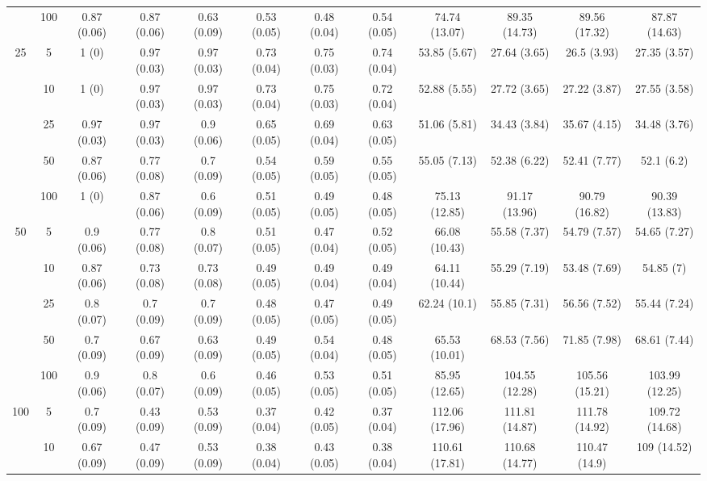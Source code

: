 \documentclass[10pt]{article}
\theoremstyle{definition}
\begin{document}
\begin{table}[H]
\begin{center}
{\begin{tabular}{cc|ccc|ccc|cccc|}
    & 100  & 0.87 (0.06) & 0.87 (0.06) & 0.63 (0.09) & 0.53 (0.05) & 0.48 (0.04) & 0.54 (0.05) & 74.74 (13.07) & 89.35 (14.73) & 89.56 (17.32) & 87.87 (14.63)\\[.3cm] 
   \multirow{5}{*}{25}  & 5  & 1 (0) & 0.97 (0.03) & 0.97 (0.03) & 0.73 (0.04) & 0.75 (0.03) & 0.74 (0.04) & 53.85 (5.67) & 27.64 (3.65) & 26.5 (3.93) & 27.35 (3.57) \\ 
    & 10  & 1 (0) & 0.97 (0.03) & 0.97 (0.03) & 0.73 (0.04) & 0.75 (0.03) & 0.72 (0.04) & 52.88 (5.55) & 27.72 (3.65) & 27.22 (3.87) & 27.55 (3.58) \\ 
    & 25  & 0.97 (0.03) & 0.97 (0.03) & 0.9 (0.06) & 0.65 (0.05) & 0.69 (0.04) & 0.63 (0.05) & 51.06 (5.81) & 34.43 (3.84) & 35.67 (4.15) & 34.48 (3.76) \\ 
    & 50  & 0.87 (0.06) & 0.77 (0.08) & 0.7 (0.09) & 0.54 (0.05) & 0.59 (0.05) & 0.55 (0.05) & 55.05 (7.13) & 52.38 (6.22) & 52.41 (7.77) & 52.1 (6.2) \\ 
    & 100  & 1 (0) & 0.87 (0.06) & 0.6 (0.09) & 0.51 (0.05) & 0.49 (0.05) & 0.48 (0.05) & 75.13 (12.85) & 91.17 (13.96) & 90.79 (16.82) & 90.39 (13.83) \\[.3cm]
   \multirow{5}{*}{50}  & 5  & 0.9 (0.06) & 0.77 (0.08) & 0.8 (0.07) & 0.51 (0.05) & 0.47 (0.04) & 0.52 (0.05) & 66.08 (10.43) & 55.58 (7.37) & 54.79 (7.57) & 54.65 (7.27) \\ 
    & 10  & 0.87 (0.06) & 0.73 (0.08) & 0.73 (0.08) & 0.49 (0.05) & 0.49 (0.04) & 0.49 (0.04) & 64.11 (10.44) & 55.29 (7.19) & 53.48 (7.69) & 54.85 (7) \\ 
    & 25  & 0.8 (0.07) & 0.7 (0.09) & 0.7 (0.09) & 0.48 (0.05) & 0.47 (0.05) & 0.49 (0.05) & 62.24 (10.1) & 55.85 (7.31) & 56.56 (7.52) & 55.44 (7.24) \\ 
    & 50  & 0.7 (0.09) & 0.67 (0.09) & 0.63 (0.09) & 0.49 (0.05) & 0.54 (0.04) & 0.48 (0.05) & 65.53 (10.01) & 68.53 (7.56) & 71.85 (7.98) & 68.61 (7.44) \\ 
    & 100  & 0.9 (0.06) & 0.8 (0.07) & 0.6 (0.09) & 0.46 (0.05) & 0.53 (0.05) & 0.51 (0.05) & 85.95 (12.65) & 104.55 (12.28) & 105.56 (15.21) & 103.99 (12.25) \\[.3cm] 
   \multirow{5}{*}{100}  & 5  & 0.7 (0.09) & 0.43 (0.09) & 0.53 (0.09) & 0.37 (0.04) & 0.42 (0.05) & 0.37 (0.04) & 112.06 (17.96) & 111.81 (14.87) & 111.78 (14.92) & 109.72 (14.68) \\ 
    & 10  & 0.67 (0.09) & 0.47 (0.09) & 0.53 (0.09) & 0.38 (0.04) & 0.43 (0.05) & 0.38 (0.04) & 110.61 (17.81) & 110.68 (14.77) & 110.47 (14.9) & 109 (14.52) \\ 

\end{tabular}}
\end{center}
\end{table}
\end{document}
